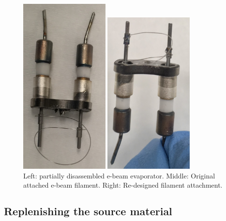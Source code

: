 \begin{figure}[H]
\begin{minipage}[b]{0.33\linewidth}
	\centering
	\includegraphics[width=0.4\textwidth]{filament.jpg}  %
\end{minipage}\hfill
\begin{minipage}[b]{0.33\linewidth}
	\centering
	\includegraphics[width=0.4\textwidth]{filament_new_design.jpg}  %
\end{minipage}\hfill
	\caption{Left: partially disassembled e-beam evaporator. Middle: Original attached e-beam filament. Right: Re-designed filament attachment.}
	\label{fig:filament}
\end{figure}

\subsection{Replenishing the source material}
